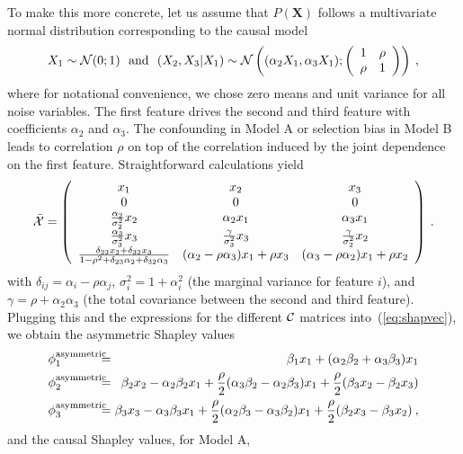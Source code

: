 \documentclass{article}
\newcommand{\vX}{\mathbf{X}}
\newcommand{\contribution}{{\phi}}
\newcommand{\allmeans}{{\cal X}}
\newcommand{\contmat}{{\cal C}}
\newcommand{\boven}[2]{#1^{\mbox{\scriptsize #2}}}
\newcommand{\isequal}{\hspace*{-2.5mm} & = & \hspace*{-2.5mm}}
\begin{document}
To make this more concrete, let us assume that $P(\vX)$ follows a multivariate normal distribution corresponding to the causal model
\[
X_1 \sim {\cal N}(0;1) \mbox{~~and~~} (X_2,X_3|X_1) \sim {\cal N}\left((\alpha_2 X_1, \alpha_3 X_1); \left(\begin{array}{cc} 1 & \rho \\ \rho & 1 \end{array} \right) \right) \: ,
\]
where for notational convenience, we chose zero means and unit variance for all noise variables. The first feature drives the second and third feature with coefficients $\alpha_2$ and $\alpha_3$. The confounding in Model A or selection bias in Model B  leads to correlation $\rho$ on top of the correlation induced by the joint dependence on the first feature. Straightforward calculations yield
\[
\bar{\allmeans} = \left(\begin{array}{ccc}
x_1 & x_2 & x_3 \\
0 & 0 & 0 \\
{\alpha_2 \over \sigma_2^2} x_2 & \alpha_2 x_1 & \alpha_3 x_1 \\
{\alpha_3 \over \sigma_3^2} x_3 & {\gamma \over \sigma_3^2} x_3 & {\gamma \over \sigma_2^2} x_2 \\
{\delta_{23} x_2 + \delta_{32} x_3 \over 1 - \rho^2 + \delta_{23} \alpha_2 + \delta_{32} \alpha_3} & (\alpha_2 - \rho \alpha_3) x_1 + \rho x_3 & (\alpha_3 - \rho \alpha_2) x_1 + \rho x_2
\end{array}\right)
\: .
\]
with $\delta_{ij} = \alpha_i - \rho \alpha_j$, $\sigma_i^2 = 1 + \alpha_i^2$ (the marginal variance for feature $i$), and $\gamma = \rho + \alpha_2 \alpha_3$ (the total covariance between the second and third feature). Plugging this and the expressions for the different $\contmat$ matrices into~(\ref{eq:shapvec}), we obtain the asymmetric Shapley values
\begin{eqnarray*}
	\boven{\contribution_1}{asymmetric} \isequal \beta_1 x_1 + (\alpha_2 \beta_2 + \alpha_3 \beta_3) x_1  \\
	\boven{\contribution_2}{asymmetric} \isequal \beta_2 x_2 - \alpha_2 \beta_2 x_1 + {\rho \over 2} (\alpha_3 \beta_2 - \alpha_2 \beta_3) x_1 + {\rho \over 2} (\beta_3 x_2 - \beta_2 x_3) \\
	\boven{\contribution_3}{asymmetric} \isequal \beta_3 x_3 - \alpha_3 \beta_3 x_1 + {\rho \over 2} (\alpha_2 \beta_3 - \alpha_3 \beta_2) x_1 + {\rho \over 2}  (\beta_2 x_3 - \beta_3 x_2) \: ,
\end{eqnarray*}
and the causal Shapley values, for Model A,
\end{document}

